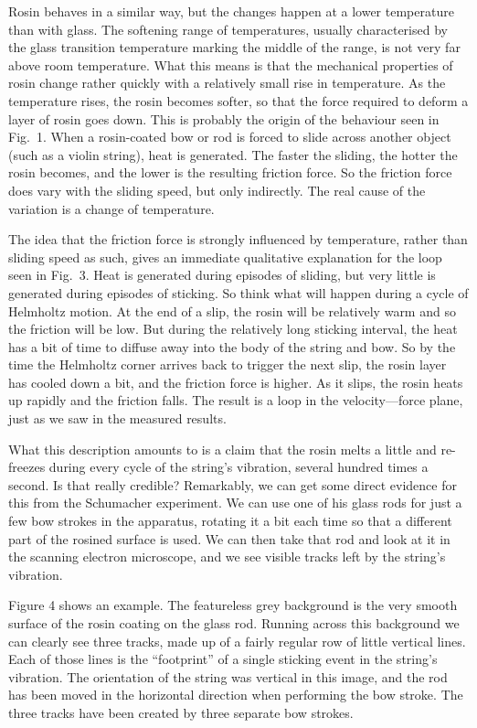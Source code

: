   Rosin behaves in a similar way, but the changes happen at a lower temperature 
  than with glass. The softening range of temperatures, usually characterised 
  by the glass transition temperature marking the middle of the range, is not 
  very far above room temperature. What this means is that the mechanical 
  properties of rosin change rather quickly with a relatively small rise in 
  temperature. As the temperature rises, the rosin becomes softer, so that the 
  force required to deform a layer of rosin goes down. This is probably the 
  origin of the behaviour seen in Fig.\ 1. When a rosin-coated bow or rod is 
  forced to slide across another object (such as a violin string), heat is 
  generated. The faster the sliding, the hotter the rosin becomes, and the 
  lower is the resulting friction force. So the friction force does vary with 
  the sliding speed, but only indirectly. The real cause of the variation is a 
  change of temperature. 

  The idea that the friction force is strongly influenced by temperature, 
  rather than sliding speed as such, gives an immediate qualitative explanation 
  for the loop seen in Fig.\ 3. Heat is generated during episodes of sliding, 
  but very little is generated during episodes of sticking. So think what will 
  happen during a cycle of Helmholtz motion. At the end of a slip, the rosin 
  will be relatively warm and so the friction will be low. But during the 
  relatively long sticking interval, the heat has a bit of time to diffuse away 
  into the body of the string and bow. So by the time the Helmholtz corner 
  arrives back to trigger the next slip, the rosin layer has cooled down a bit, 
  and the friction force is higher. As it slips, the rosin heats up rapidly and 
  the friction falls. The result is a loop in the velocity—force plane, just as 
  we saw in the measured results. 

  What this description amounts to is a claim that the rosin melts a little and 
  re-freezes during every cycle of the string’s vibration, several hundred 
  times a second. Is that really credible? Remarkably, we can get some direct 
  evidence for this from the Schumacher experiment. We can use one of his glass 
  rods for just a few bow strokes in the apparatus, rotating it a bit each time 
  so that a different part of the rosined surface is used. We can then take 
  that rod and look at it in the scanning electron microscope, and we see 
  visible tracks left by the string’s vibration. 

  Figure 4 shows an example. The featureless grey background is the very smooth 
  surface of the rosin coating on the glass rod. Running across this background 
  we can clearly see three tracks, made up of a fairly regular row of little 
  vertical lines. Each of those lines is the “footprint” of a single sticking 
  event in the string’s vibration. The orientation of the string was vertical 
  in this image, and the rod has been moved in the horizontal direction when 
  performing the bow stroke. The three tracks have been created by three 
  separate bow strokes. 

